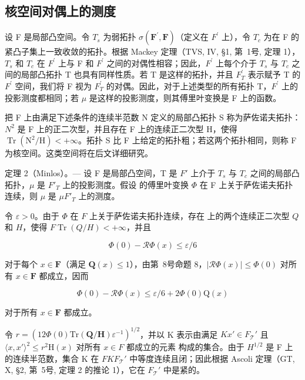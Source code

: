 \subsection{核空间对偶上的测度}

设 F 是局部凸空间。令 \(T_{s}\) 为弱拓扑 \(\sigma(\mathbf{F}^{\prime},\mathbf{F})\)（定义在 \(F^{\prime}\) 上），令 \(T_{c}\) 为在 F 的紧凸子集上一致收敛的拓扑。根据 Mackey 定理（TVS, IV, §1, 第~1号, 定理 1），\(T_{s}\) 和 \(T_{c}\) 在 \(F^{\prime}\) 上与 F 和 \(F^{\prime}\) 之间的对偶性相容；因此，\(F^{\prime}\) 上每个介于 \(T_{s}\) 与 \(T_{c}\) 之间的局部凸拓扑 T 也具有同样性质。若 T 是这样的拓扑，并且 \(F^{\prime}_{T}\) 表示赋予 T 的 \(F^{\prime}\) 空间，我们将 F 视为 \(F^{\prime}_{T}\) 的对偶。因此，对于上述类型的所有拓扑 T，\(F^{\prime}\) 上的投影测度都相同；若 \(\mu\) 是这样的投影测度，则其傅里叶变换是 F 上的函数。

把 F 上由满足下述条件的连续半范数 N 定义的局部凸拓扑 S 称为萨佐诺夫拓扑：\(N^{2}\) 是 F 上的正二次型，并且存在 F 上的连续正二次型 H，使得 \(\operatorname{Tr}\left(\mathrm{N}^{2}/\mathrm{H}\right)<+\infty\)。拓扑 S 比 F 上给定的拓扑粗；若这两个拓扑相同，则称 F 为核空间。这类空间将在后文详细研究。

定理 2（Minlos）。--- 设 F 是局部凸空间，T 是 \(F'\) 上介于 \(T_{s}\) 与 \(T_{c}\) 之间的局部凸拓扑，\(\mu\) 是 \(F'_{T}\) 上的投影测度。假设  的傅里叶变换 \(\Phi\) 在 F 上关于萨佐诺夫拓扑连续，则 \(\mu\) 是 \(\mu\)\(F'_{T}\) 上的测度。

令 \(\varepsilon > 0\)。由于 \(\Phi\) 在 \(F\) 上关于萨佐诺夫拓扑连续，存在  上的两个连续正二次型 \(Q\) 和 \(H\)，使得 \(F\)\(\operatorname{Tr}(Q / H) < +\infty\)，并且

\[
\Phi (0) - \mathcal {R} \Phi (x) \leqslant \varepsilon / 6
\]

对于每个 \(x \in \mathbf{F}\)（满足 \(\mathbf{Q}(x) \leqslant 1\)），由第~8号命题 8，\(|\mathcal{R}\Phi(x)| \leqslant \Phi(0)\) 对所有 \(x \in \mathbf{F}\) 都成立，因而

\[
\Phi (0) - \mathcal {R} \Phi (x) \leqslant \varepsilon / 6 + 2 \Phi (0) \mathrm{Q} (x)\tag{63}
\]

对于所有 \(x \in \mathbf{F}\) 都成立。

令 \(r = \left(12\Phi(0)\mathrm{Tr}(\mathbf{Q}/\mathbf{H})\varepsilon^{-1}\right)^{1/2}\)，并以 K 表示由满足 \(K\)\(x' \in F_{\mathcal{T}}'\) 且 \(\langle x, x' \rangle^2 \leqslant r^2\mathrm{H}(x)\) 对所有 \(x \in F\) 都成立的元素  构成的集合。由于 \(H^{1/2}\) 是 F 上的连续半范数，集合 K 在 \(F\)\(K\)\(F_{\mathcal{T}}'\) 中等度连续且闭；因此根据 Ascoli 定理（GT, X, §2, 第~5号, 定理 2 的推论 1），它在 \(F_{\mathcal{T}}'\) 中是紧的。

